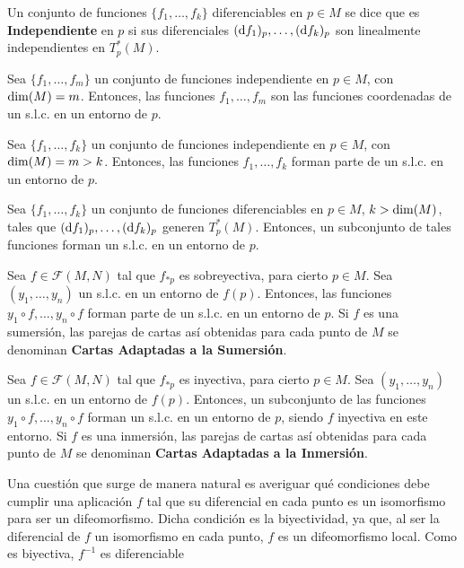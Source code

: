 \documentclass[cursovd_portada.tex]{subfiles}
\begin{document}
\begin{defi}
Un conjunto de funciones $\{f_1,\dots ,f_k\}$ diferenciables en
$p\in M$ se dice que es {\bf Independiente} en $p$ si sus
diferenciales $({\rm d} f_1)_p,\dots, ({\rm d} f_k)_p$ son linealmente
independientes en $T_p^*(M)$.
\end{defi}
\begin{coro}
Sea $\{f_1,\dots ,f_m\}$ un conjunto de funciones independiente en
$p\in M$, con ${\rm dim}(M)=m$. Entonces, las funciones $f_1,\dots
,f_m$ son las funciones coordenadas de un s.l.c. en un entorno de
$p$.
\end{coro}
\begin{coro}
Sea $\{f_1,\dots ,f_k\}$ un conjunto de funciones independiente en
$p\in M$, con ${\rm dim}(M)=m>k$. Entonces, las funciones
$f_1,\dots ,f_k$ forman parte de un s.l.c. en un entorno de $p$.
\end{coro}
\begin{coro}
Sea $\{f_1,\dots ,f_k\}$ un conjunto de funciones diferenciables
en $p\in M$, $k>{\rm dim}(M)$, tales que $({\rm d} f_1)_p,\dots
,({\rm d} f_k)_p$ generen $T_p^*(M)$. Entonces, un subconjunto de
tales funciones forman un s.l.c. en un entorno de $p$.
\end{coro}
\begin{coro}
Sea $f\in\mathcal{F}(M,N)$ tal que $f_{*p}$ es sobreyectiva, para
cierto $p\in M$. Sea $(y_1,\dots ,y_n)$ un s.l.c. en un entorno de
$f(p)$. Entonces, las funciones \ $y_1\circ f,\dots ,y_n\circ f$
forman parte de un s.l.c. en un entorno de $p$. Si $f$ es una
sumersión, las parejas de cartas así obtenidas para cada
punto de $M$ se denominan {\bf Cartas Adaptadas a la
Sumersión}.
\end{coro}
\begin{coro}
Sea $f\in\mathcal{F}(M,N)$ tal que $f_{*p}$ es inyectiva, para
cierto $p\in M$. Sea $(y_1,\dots ,y_n)$ un s.l.c. en un entorno de
$f(p)$. Entonces, un subconjunto de las funciones $y_1\circ
f,\dots ,y_n\circ f$ forman un s.l.c. en un entorno de $p$, siendo
$f$ inyectiva en este entorno. Si $f$ es una inmersión, las
parejas de cartas así obtenidas para cada punto de $M$ se
denominan {\bf Cartas Adaptadas a la Inmersión}.
\end{coro}
Una cuestión que surge de manera natural es averiguar qué
condiciones debe cumplir una aplicación $f$ tal que su
diferencial en cada punto es un isomorfismo para ser un
difeomorfismo. Dicha condición es la biyectividad, ya que, al
ser la diferencial de $f$ un isomorfismo en cada punto, $f$ es un
difeomorfismo local. Como es biyectiva, $f^{-1}$ es diferenciable
\end{document}
